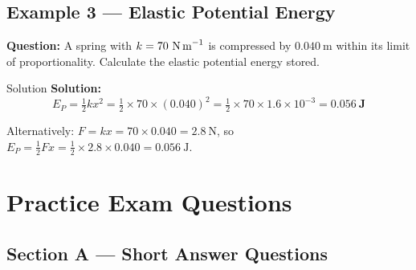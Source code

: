 \subsection*{Example 3 — Elastic Potential Energy}

\textbf{Question:} A spring with $k = 70\ \text{N\,m}^{-1}$ is compressed by $0.040\ \text{m}$ within its limit of proportionality. Calculate the elastic potential energy stored.

\begin{examplebox}{Solution}
\textbf{Solution:}\\
$$E_P = \tfrac{1}{2}kx^2 = \tfrac{1}{2} \times 70 \times (0.040)^2 = \tfrac{1}{2} \times 70 \times 1.6\times10^{-3} = \mathbf{0.056\ \text{J}}$$

Alternatively: $F = kx = 70 \times 0.040 = 2.8\ \text{N}$, so $E_P = \tfrac{1}{2}Fx = \tfrac{1}{2} \times 2.8 \times 0.040 = 0.056\ \text{J}$. \checkmark
\end{examplebox}

\section{Practice Exam Questions}

\subsection*{Section A — Short Answer Questions}

